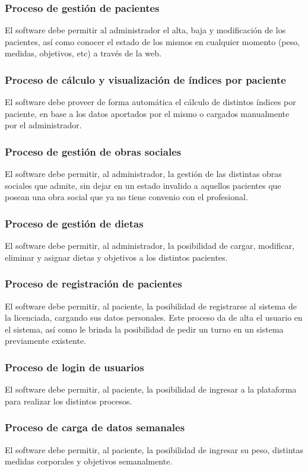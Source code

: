 \documentclass[runningheads,a4paper,spanish]{llncs}
\begin{document}
\subsubsection{Proceso de gestión de pacientes}
El software debe permitir al administrador el alta, baja y modificación de los pacientes, así como conocer el estado de los mismos en cualquier momento (peso, medidas, objetivos, etc) a través de la web.
\subsubsection{Proceso de cálculo y visualización de índices por paciente}
El software debe proveer de forma automática el cálculo de distintos índices por paciente, en base a los datos aportados por el mismo o cargados manualmente por el administrador. 
\subsubsection{Proceso de gestión de obras sociales}
 El software debe permitir, al administrador, la gestión de las distintas obras sociales que admite, sin dejar en un estado invalido a aquellos pacientes que posean una obra social que ya no tiene convenio con el profesional.
\subsubsection{Proceso de gestión de dietas}
 El software debe permitir, al administrador, la posibilidad de cargar, modificar, eliminar y asignar dietas y objetivos a los distintos pacientes.
\subsubsection{Proceso de registración de pacientes}
El software debe permitir, al paciente, la posibilidad de registrarse al sistema de la licenciada, cargando sus datos personales. Este proceso da de alta el usuario en el sistema, así como le brinda la posibilidad de pedir un turno en un sistema previamente existente.
\subsubsection{Proceso de login de usuarios}
 El software debe permitir, al paciente, la posibilidad de ingresar a la plataforma para realizar los distintos procesos.
\subsubsection{Proceso de carga de datos semanales}
 El software debe permitir, al paciente, la posibilidad de ingresar su peso, distintas medidas corporales y objetivos semanalmente.
\end{document}
